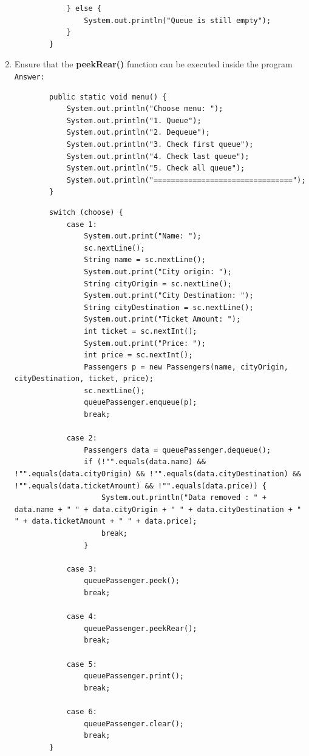 \documentclass[12pt,titlepage]{article}
\begin{document}
\begin{enumerate}
\begin{verbatim}
            } else {
                System.out.println("Queue is still empty");
            }
        }
    \end{verbatim}
    \item Ensure that the \textbf{peekRear()} function can be executed inside the program
    \mbox{}\\
    \texttt{Answer: }
    \begin{verbatim}
        public static void menu() {
            System.out.println("Choose menu: ");
            System.out.println("1. Queue");
            System.out.println("2. Dequeue");
            System.out.println("3. Check first queue");
            System.out.println("4. Check last queue");
            System.out.println("5. Check all queue");
            System.out.println("================================");
        }
    \end{verbatim}
    \begin{verbatim}
        switch (choose) {
            case 1:
                System.out.print("Name: ");
                sc.nextLine();
                String name = sc.nextLine();
                System.out.print("City origin: ");
                String cityOrigin = sc.nextLine();
                System.out.print("City Destination: ");
                String cityDestination = sc.nextLine();
                System.out.print("Ticket Amount: ");
                int ticket = sc.nextInt();
                System.out.print("Price: ");
                int price = sc.nextInt();
                Passengers p = new Passengers(name, cityOrigin, cityDestination, ticket, price);
                sc.nextLine();
                queuePassenger.enqueue(p);
                break;
        
            case 2:
                Passengers data = queuePassenger.dequeue();
                if (!"".equals(data.name) && !"".equals(data.cityOrigin) && !"".equals(data.cityDestination) && !"".equals(data.ticketAmount) && !"".equals(data.price)) {
                    System.out.println("Data removed : " + data.name + " " + data.cityOrigin + " " + data.cityDestination + " " + data.ticketAmount + " " + data.price);
                    break;
                }
            
            case 3:
                queuePassenger.peek();
                break;
            
            case 4:
                queuePassenger.peekRear();
                break;
            
            case 5:
                queuePassenger.print();
                break;
            
            case 6:
                queuePassenger.clear();
                break;
        }
    \end{verbatim}
\end{enumerate}
\end{document}
